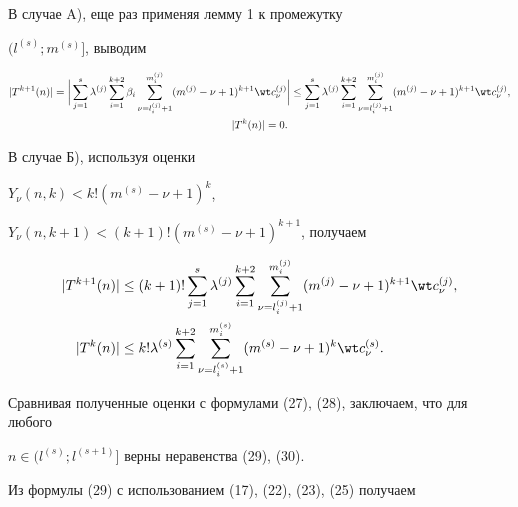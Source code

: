 В случае A), еще раз применяя лемму 1 к промежутку 


$(l^{(s)}; m^{(s)}]$, выводим 


\begin{gather}


|T^{k+1} (n)|=\bigg| \sum_{j=1}^{s} \lambda^{(j)} 


\sum_{i=1}^{k+2} \beta_i 


\sum_{\nu=l_i^{(j)}+1}^{m_i^{(j)}} (m^{(j)}-\nu+1)^{k+1} 


\wt c{}_{\nu}^{(j)} \bigg| \le 


%


\sum_{j=1}^{s} \lambda^{(j)} \sum_{i=1}^{k+2} 


\sum_{\nu=l_i^{(j)}+1}^{m_i^{(j)}} (m^{(j)}-\nu+1)^{k+1} 


\wt c{}_{\nu}^{(j)},\\


%


|T^k (n) |=0.


\end{gather}


В случае Б), используя оценки


$Y_{\nu} (n, k)<k! (m^{(s)}-\nu+1)^{k}$, 


$Y_{\nu} (n, k+1)<(k+1)! (m^{(s)}-\nu+1)^{k+1}$, получаем 


\begin{align}


|T^{k+1} (n)| &\le (k+1)! \sum_{j=1}^{s} \lambda^{(j)} 


\sum_{i=1}^{k+2} \sum_{\nu=l_i^{(j)}+1}^{m_i^{(j)}} (m^{(j)}-\nu+1)^{k+1} 


\wt c{}_{\nu}^{(j)},\\


%


| T^{k} (n) | &\le k! \lambda^{(s)} \sum_{i=1}^{k+2} 


\sum_{\nu=l_i^{(s)}+1}^{m_i^{(s)}} (m^{(s)}-\nu+1)^{k} 


\wt c{}_{\nu}^{(s)}.


\end{align}


Сравнивая полученные оценки с формулами (27), (28), заключаем, что для любого 


$n \in (l^{(s)}; l^{(s+1)}]$ верны неравенства (29), (30).





Из формулы (29) с использованием (17), (22), (23), (25) получаем


